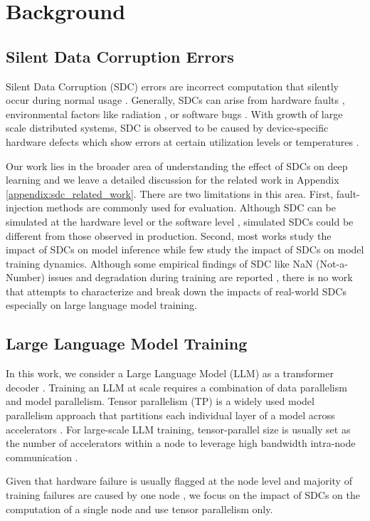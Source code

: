 \section{Background} \label{sec:background}

\subsection{Silent Data Corruption Errors} \label{sec:sdc_background} 
Silent Data Corruption (SDC) errors are incorrect computation that silently occur during normal usage \cite{papadimitriousilentdatacorruptions2023}. Generally, SDCs can arise from hardware faults \cite{dixit2021silentdatacorruptionsscale, hochschild2021cores}, environmental factors like radiation \cite{ziegler1996terrestrial, mukherjee2005soft, baumann2005radiation}, or software bugs \cite{lou2022demystifying}. 
With growth of large scale distributed systems, SDC is observed to be caused by device-specific hardware defects which show errors at certain utilization levels or temperatures \cite{ dixit2021silentdatacorruptionsscale, hochschild2021cores, wang2023understandingsdc}. 

Our work lies in the broader area of understanding the effect of SDCs on deep learning and we leave a detailed discussion for the related work in Appendix \ref{appendix:sdc_related_work}.
There are two limitations in this area. 
First, fault-injection methods are commonly used for evaluation. Although SDC can be simulated at the hardware level \cite{rech2022reliability, liunderstandingerrorpropagation} or the software level \cite{he2020fidelity, agarwal2022lltfi}, simulated SDCs could be different from those observed in production. 
Second, most works study the impact of SDCs on model inference \cite{liunderstandingerrorpropagation, agarwal2023resilience, ma2023evaluatingenhancingrobustnessdeep} while few study the impact of SDCs on model training dynamics. Although some empirical findings of SDC like NaN (Not-a-Number) issues and degradation during training are reported \cite{adept-sdc, he2023understanding}, there is no work that attempts to characterize and break down the impacts of real-world SDCs especially on large language model training.

\subsection{Large Language Model Training}
In this work, we consider a Large Language Model (LLM) as a transformer decoder \cite{vaswani2017attentionneed}. Training an LLM at scale requires a combination of data parallelism and model parallelism. Tensor parallelism (TP) is a widely used model parallelism approach that partitions each individual layer of a model across accelerators \cite{shoeybi2020megatronlmtrainingmultibillionparameter}. For large-scale LLM training, tensor-parallel size is usually set as the number of accelerators within a node to leverage high bandwidth intra-node communication \cite{narayanan2021efficient}.

Given that hardware failure is usually flagged at the node level and majority of training failures are caused by one node \cite{wang2023gemini}, we focus on the impact of SDCs on the computation of a single node and use tensor parallelism only.

